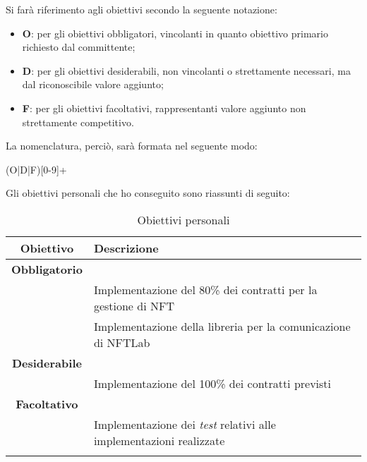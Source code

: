 \noindent Si farà riferimento agli obiettivi secondo la seguente notazione:
\begin{itemize}
  \item \textbf{O}: per gli obiettivi obbligatori, vincolanti in quanto obiettivo primario richiesto dal committente;
  \item \textbf{D}: per gli obiettivi desiderabili, non vincolanti o strettamente necessari, ma dal riconoscibile valore aggiunto;
  \item \textbf{F}: per gli obiettivi facoltativi, rappresentanti valore aggiunto non strettamente competitivo.
\end{itemize}

\noindent La nomenclatura, perciò, sarà formata nel seguente modo:
\begin{center}
  (O|D|F)[0-9]+
\end{center}

\noindent Gli obiettivi personali che ho conseguito sono riassunti di seguito:
\begin{longtabu}{|c|X|}
  \hline

  \textbf{Obiettivo} & \textbf{Descrizione} \\ \hline

  \textbf{Obbligatorio} & \\

   \label{personal-goal:O.smart-contract} & Implementazione del 80\% dei contratti per la gestione di NFT \\
   \label{personal-goal:O.library} & Implementazione della libreria per la comunicazione di NFTLab \\

  \hline

  \textbf{Desiderabile} &  \\
  
   \label{personal-goal:D.smart-contract} & Implementazione del 100\% dei contratti previsti \\

  \hline

  \textbf{Facoltativo} & \\

   \label{personal-goal:F.tests} & Implementazione dei \textit{test} relativi alle implementazioni realizzate \\

  \hline

  \caption{Obiettivi personali}
\end{longtabu}
